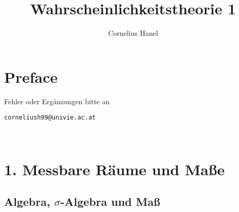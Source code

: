 \documentclass[12pt]{report}
\title{Wahrscheinlichkeitstheorie 1}
\author{Cornelius Hanel}
\begin{document}
\maketitle

\chapter*{Preface}
Fehler oder Erg\"anzungen bitte an
\newline
\begin{center}
    \texttt{corneliush99@univie.ac.at}
\end{center}

\tableofcontents


\newcommand{\E}{\mathbb{E}}
\newcommand{\cR}{\mathcal{R}}
\newcommand{\cB}{\mathcal{B}}
\newcommand{\C}{\mathbb{C}}
\newcommand{\del}{\partial}
\newcommand{\A}{\mathcal{A}}
\newcommand{\M}{\mathcal{M}}
\newcommand{\G}{\mathcal{G}}
\renewcommand{\geq}{\geqslant}
\renewcommand{\leq}{\leqslant}
\newcommand{\eps}{\varepsilon}
\newcommand{\Pp}{\mathbb{P}}
\newcommand{\R}{\mathbb{R}}
\newcommand{\Var}{\operatorname{Var}}
\newcommand{\pspace}{(\Omega, \mathcal{A}, \Pp)}
\newcommand{\borel}{\mathcal{B}(\R)}
\newcommand{\ind}[1]{\mathds{1}_{#1}}
\newcommand{\nto}[2]{\xrightarrow[#2]{\makebox[1.5em][c]{$\scriptstyle#1$}}}‌
\newcommand{\krestr}[1]{%
  \sbox{0}{\raisebox{\dimexpr\fontcharht\font`A-\height\relax}{$\big|$}}%
  \usebox{0}%
  \raisebox{\dimexpr-\dp0+\depth\relax}{$\scriptstyle#1$}%
}

\chapter*{1. Messbare R\"aume und Ma\ss{}e}

\section*{Algebra, $\sigma$-Algebra und Ma\ss{}}
\end{document}
